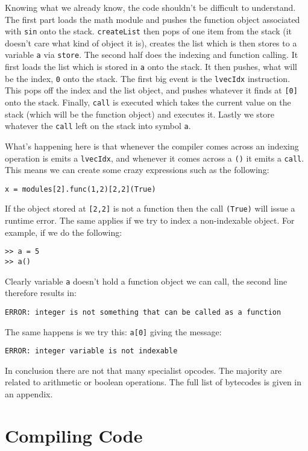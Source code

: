 Knowing what we already know, the code shouldn't be difficult to understand. The first part loads the math module and pushes the function object associated with {\tt sin} onto the stack. {\tt createList} then pops of one item from the stack (it doesn't care what kind of object it is), creates the list which is then stores to a variable {\tt a} via {\tt store}. The second half does the indexing and function calling. It first loads the list which is stored in {\tt a} onto the stack. It then pushes, what will be the index, {\tt 0} onto the stack. The first big event is the {\tt lvecIdx} instruction. This pops off the index and the list object, and pushes whatever it finds at {\tt [0]} onto the stack. Finally, {\tt call} is executed which takes the current value on the stack (which will be the function object) and executes it. Lastly we store whatever the {\tt call} left on the stack into symbol {\tt a}.

What's happening here is that whenever the compiler comes across an indexing operation is emits a {\tt lvecIdx}, and whenever it comes across a {\tt ()} it emits a {\tt call}. This means we can create some crazy expressions such as the following:

\begin{lstlisting}
x = modules[2].func(1,2)[2,2](True)
\end{lstlisting}

If the object stored at {\tt [2,2]} is not a function then the call {\tt (True)} will issue a runtime error. The same applies if we try to index a non-indexable object. For example, if we do the following:

\begin{lstlisting}
>> a = 5
>> a()
\end{lstlisting}

Clearly variable {\tt a} doesn't hold a function object we can call, the second line therefore results in:

{\tt\small ERROR: integer is not something that can be called as a function}

The same happens is we try this: {\tt a[0]} giving the message:

{\tt\small ERROR: integer variable is not indexable}

In conclusion there are not that many specialist opcodes. The majority are related to arithmetic or boolean operations. The full list of bytecodes is given in an appendix.


\section{Compiling Code}

